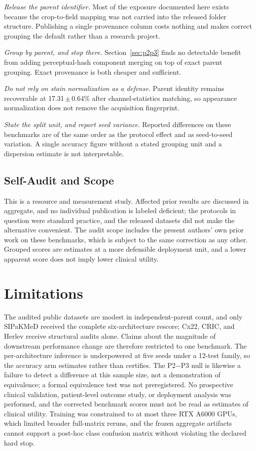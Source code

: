 \documentclass[conference]{IEEEtran}
\newcommand{\meanpm}[2]{#1\,$\pm$\,#2}
\newcommand{\protocol}[1]{\textsf{#1}}
\begin{document}
\emph{Release the parent identifier.}
Most of the exposure documented here exists because the crop-to-field mapping was not carried into the released folder structure. Publishing a single provenance column costs nothing and makes correct grouping the default rather than a research project.

\emph{Group by parent, and stop there.}
Section~\ref{sec:p2p3} finds no detectable benefit from adding perceptual-hash component merging on top of exact parent grouping. Exact provenance is both cheaper and sufficient.

\emph{Do not rely on stain normalization as a defense.}
Parent identity remains recoverable at \meanpm{17.31}{0.64}\% after channel-statistics matching, so appearance normalization does not remove the acquisition fingerprint.

\emph{State the split unit, and report seed variance.}
Reported differences on these benchmarks are of the same order as the protocol effect and as seed-to-seed variation. A single accuracy figure without a stated grouping unit and a dispersion estimate is not interpretable.

\subsection{Self-Audit and Scope}
This is a resource and measurement study.
Affected prior results are discussed in aggregate, and no individual publication is labeled deficient; the protocols in question were standard practice, and the released datasets did not make the alternative convenient.
The audit scope includes the present authors' own prior work on these benchmarks, which is subject to the same correction as any other.
Grouped scores are estimates at a more defensible deployment unit, and a lower apparent score does not imply lower clinical utility.

\section{Limitations}
The audited public datasets are modest in independent-parent count, and only SIPaKMeD received the complete six-architecture rescore; Cx22, CRIC, and Herlev receive structural audits alone.
Claims about the magnitude of downstream performance change are therefore restricted to one benchmark.
The per-architecture inference is underpowered at five seeds under a 12-test family, so the accuracy arm estimates rather than certifies.
The \protocol{P2}$-$\protocol{P3} null is likewise a failure to detect a difference at this sample size, not a demonstration of equivalence; a formal equivalence test was not preregistered.
No prospective clinical validation, patient-level outcome study, or deployment analysis was performed, and the corrected benchmark scores must not be read as estimates of clinical utility.
Training was constrained to at most three RTX A6000 GPUs, which limited broader full-matrix reruns, and the frozen aggregate artifacts cannot support a post-hoc class confusion matrix without violating the declared hard stop.
\end{document}
